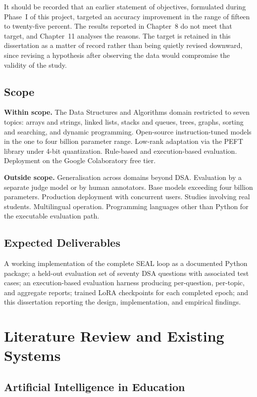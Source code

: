 \documentclass[12pt,a4paper]{report}
\begin{document}
It should be recorded that an earlier statement of objectives, formulated during Phase~I of this project, targeted an accuracy improvement in the range of fifteen to twenty-five percent. The results reported in Chapter~8 do not meet that target, and Chapter~11 analyses the reasons. The target is retained in this dissertation as a matter of record rather than being quietly revised downward, since revising a hypothesis after observing the data would compromise the validity of the study.

\section{Scope}

\textbf{Within scope.} The Data Structures and Algorithms domain restricted to seven topics: arrays and strings, linked lists, stacks and queues, trees, graphs, sorting and searching, and dynamic programming. Open-source instruction-tuned models in the one to four billion parameter range. Low-rank adaptation via the PEFT library under 4-bit quantization. Rule-based and execution-based evaluation. Deployment on the Google Colaboratory free tier.

\textbf{Outside scope.} Generalisation across domains beyond DSA. Evaluation by a separate judge model or by human annotators. Base models exceeding four billion parameters. Production deployment with concurrent users. Studies involving real students. Multilingual operation. Programming languages other than Python for the executable evaluation path.

\section{Expected Deliverables}

A working implementation of the complete SEAL loop as a documented Python package; a held-out evaluation set of seventy DSA questions with associated test cases; an execution-based evaluation harness producing per-question, per-topic, and aggregate reports; trained LoRA checkpoints for each completed epoch; and this dissertation reporting the design, implementation, and empirical findings.

\chapter{Literature Review and Existing Systems}

\section{Artificial Intelligence in Education}
\end{document}
